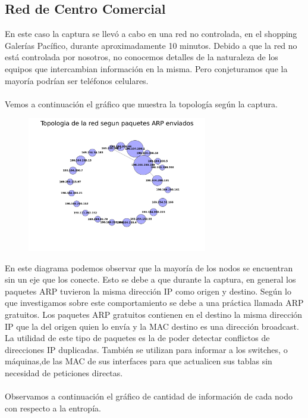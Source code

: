 \subsection{Red de Centro Comercial}

En este caso la captura se llevó a cabo en una red no controlada, en el shopping Galerías Pacífico, durante aproximadamente 10 minutos.
Debido a que la red no está controlada por nosotros, no conocemos detalles de la naturaleza de los equipos que intercambian información en la misma. Pero conjeturamos que la mayoría podrían ser teléfonos celulares.
\\\\
Vemos a continuación el gráfico que muestra la topología según la captura.

\FloatBarrier

\begin{figure}[ht!]
  \centering
   \includegraphics[width=0.7\textwidth]{graficos/shopping_network.png}
  \caption{}
  \label{fig:shopping_network}
\end{figure}

\FloatBarrier

En este diagrama podemos observar que la mayoría de los nodos se encuentran sin un eje que los conecte. Esto se debe a que durante la captura, en general los paquetes ARP tuvieron la misma dirección IP como origen y destino. Según lo que investigamos sobre este comportamiento se debe a una práctica llamada ARP gratuitos. Los paquetes ARP gratuitos contienen en el destino la misma dirección IP que la del origen quien lo envía y la MAC destino es una dirección broadcast. La utilidad de este tipo de paquetes es la de poder detectar conflictos de direcciones IP duplicadas. También se utilizan para informar a los switches, o máquinas,de las MAC de sus interfaces para que actualicen sus tablas sin necesidad de peticiones directas.
\\\\
Observamos a continuación el gráfico de cantidad de información de cada nodo con respecto a la entropía.

